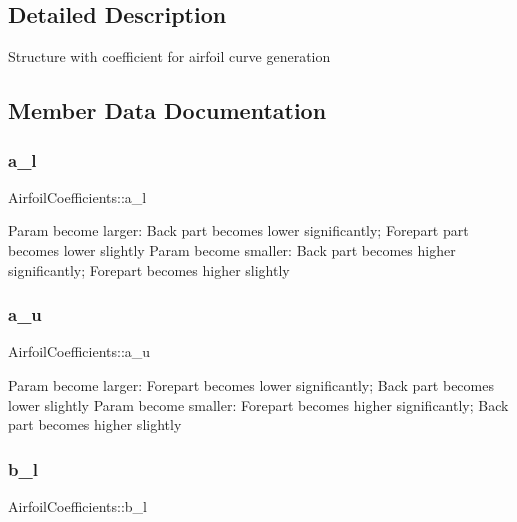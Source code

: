 \subsection{Detailed Description}
Structure with coefficient for airfoil curve generation 

\subsection{Member Data Documentation}
\mbox{\label{struct_airfoil_coefficients_a9b8421053a97ec5dcf0bc1cc6dd7e2a1}} 
\subsubsection{\texorpdfstring{a\+\_\+l}{a\_l}}
{\footnotesize\ttfamily Airfoil\+Coefficients\+::a\+\_\+l}

Param become larger\+: Back part becomes lower significantly; Forepart part becomes lower slightly Param become smaller\+: Back part becomes higher significantly; Forepart becomes higher slightly \mbox{\label{struct_airfoil_coefficients_a7987ccdf3ca120dc8b96004cea2808c4}} 
\subsubsection{\texorpdfstring{a\+\_\+u}{a\_u}}
{\footnotesize\ttfamily Airfoil\+Coefficients\+::a\+\_\+u}

Param become larger\+: Forepart becomes lower significantly; Back part becomes lower slightly Param become smaller\+: Forepart becomes higher significantly; Back part becomes higher slightly \mbox{\label{struct_airfoil_coefficients_ab6c29fe2ddce0a9b700d2a312791995a}} 
\subsubsection{\texorpdfstring{b\+\_\+l}{b\_l}}
{\footnotesize\ttfamily Airfoil\+Coefficients\+::b\+\_\+l}

